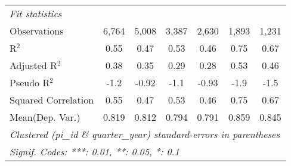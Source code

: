 \begin{tabular}{lcccccc}
   \midrule
   \emph{Fit statistics}\\
   Observations                                               & 6,764    & 5,008         & 3,387    & 2,630         & 1,893        & 1,231\\  
   R$^2$                                                      & 0.55     & 0.47          & 0.53     & 0.46          & 0.75         & 0.67\\  
   Adjusted R$^2$                                             & 0.38     & 0.35          & 0.29     & 0.28          & 0.53         & 0.46\\  
   Pseudo R$^2$                                               & -1.2     & -0.92         & -1.1     & -0.93         & -1.9         & -1.5\\  
   Squared Correlation                                        & 0.55     & 0.47          & 0.53     & 0.46          & 0.75         & 0.67\\  
Mean(Dep. Var.) & 0.819 & 0.812 & 0.794 & 0.791 & 0.859 & 0.845 \\
   \midrule \midrule
   \multicolumn{7}{l}{\emph{Clustered (pi\_id \& quarter\_year) standard-errors in parentheses}}\\
   \multicolumn{7}{l}{\emph{Signif. Codes: ***: 0.01, **: 0.05, *: 0.1}}\\
\end{tabular}
\par\endgroup
